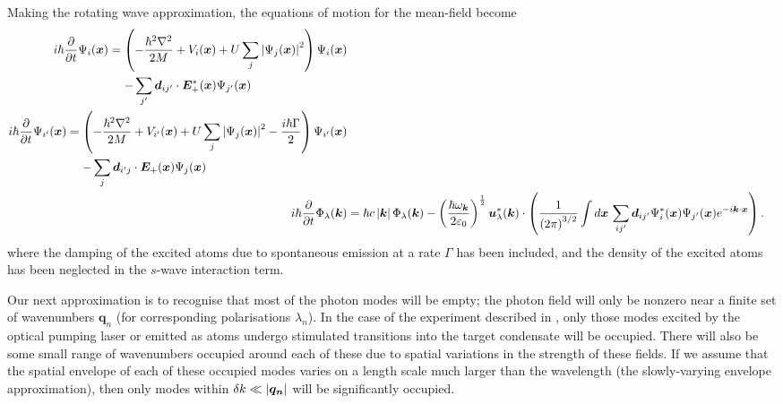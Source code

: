 Making the rotating wave approximation, the equations of motion for the mean-field become
\begin{subequations}
    \label{OpticalPumping:MeanFieldRWAEvolution}
    \begin{align}
        \begin{split}
            i \hbar \frac{\partial}{\partial t} \Psi_i(\bm{x}) &= \left( -\frac{\hbar^2 \nabla^2}{2M} + V_i(\bm{x}) + U \sum_j \abs{\Psi_j(\bm{x})}^2\right) \Psi_i(\bm{x})\\
            &\relphantom{=} - \sum_{j'} \bm{d}_{ij'} \cdot \bm{E}_+^*(\bm{x}) \Psi_{j'}(\bm{x})
        \end{split}\\
        \begin{split}
            i \hbar \frac{\partial}{\partial t} \Psi_{i'}(\bm{x}) &= \left( -\frac{\hbar^2 \nabla^2}{2M} + V_{i'}(\bm{x}) + U \sum_j \abs{\Psi_j(\bm{x})}^2 - \frac{i\hbar \Gamma}{2}\right) \Psi_{i'}(\bm{x})\\
            &\relphantom{=} - \sum_j \bm{d}_{i'j} \cdot \bm{E}_+(\bm{x}) \Psi_j(\bm{x}) 
        \end{split}\\
        i \hbar \frac{\partial}{\partial t} \Phi_\lambda(\bm{k}) &= \hbar c \abs{\bm{k}} \Phi_\lambda(\bm{k}) - \left(\frac{\hbar \omega_{\bm{k}}}{2 \varepsilon_0}\right)^{\frac{1}{2}} \bm{u}_\lambda^*(\bm{k}) \cdot \left( \frac{1}{\left(2\pi\right)^{3/2}} \int d \bm{x}\, \sum_{ij'}\bm{d}_{ij'} \Psi^*_i(\bm{x}) \Psi_{j'}(\bm{x}) e^{-i \bm{k} \cdot \bm{x}} \right). \label{OpticalPumping:MeanFieldPhotonRWAEvolution}
    \end{align}
\end{subequations}
where the damping of the excited atoms due to spontaneous emission at a rate $\Gamma$ has been included, and the density of the excited atoms has been neglected in the $s$-wave interaction term.

Our next approximation is to recognise that most of the photon modes will be empty; the photon field will only be nonzero near a finite set of wavenumbers $\bm{q}_n$ (for corresponding polarisations $\lambda_n$).  In the case of the experiment described in , only those modes excited by the optical pumping laser or emitted as atoms undergo stimulated transitions into the target condensate will be occupied.  There will also be some small range of wavenumbers occupied around each of these due to spatial variations in the strength of these fields.  If we assume that the spatial envelope of each of these occupied modes varies on a length scale much larger than the wavelength (the slowly-varying envelope approximation), then only modes within $\delta k \ll \left|\bm{q_n}\right|$ will be significantly occupied.

